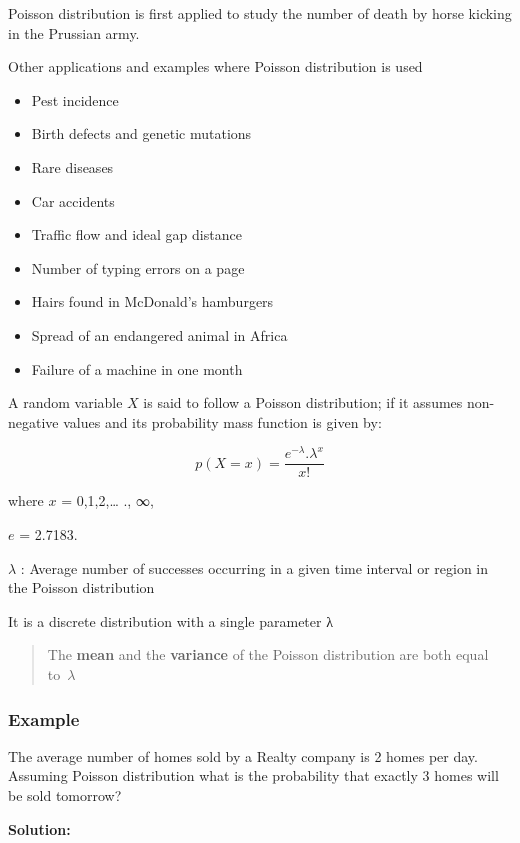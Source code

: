 \documentclass[
]{book}
\begin{document}
Poisson distribution is first applied to study the number of death by
horse kicking in the Prussian army.

Other applications and examples where Poisson distribution is used

\begin{itemize}
\item
  Pest incidence
\item
  Birth defects and genetic mutations
\item
  Rare diseases
\item
  Car accidents
\item
  Traffic flow and ideal gap distance
\item
  Number of typing errors on a page
\item
  Hairs found in McDonald's hamburgers
\item
  Spread of an endangered animal in Africa
\item
  Failure of a machine in one month
\end{itemize}

A random variable \(X\) is said to follow a Poisson distribution; if it
assumes non-negative values and its probability mass function is given
by:

\[p\left( X = x \right) = \frac{e^{- \lambda}.\lambda^{x}}{x!}\]

where \(x\) = 0,1,2,\ldots{} ., ∞,

\(e\) = 2.7183.

\(λ\) : Average number of successes occurring in a given time interval or
region in the Poisson distribution

It is a discrete distribution with a single parameter λ

\begin{quote}
The \textbf{mean} and the \textbf{variance} of the Poisson distribution are both
equal to~\(λ\)
\end{quote}

\hypertarget{example-8}{%
\subsubsection*{Example}\label{example-8}}

The average number of homes sold by a Realty company is 2 homes per day.
Assuming Poisson distribution what is the probability that exactly 3
homes will be sold tomorrow?

\textbf{Solution:}
\end{document}
